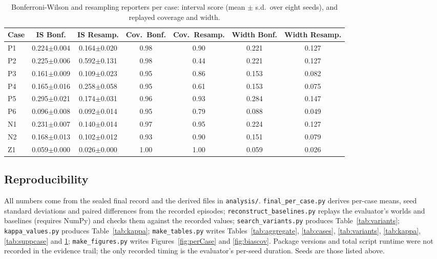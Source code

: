 \documentclass{article}
\begin{document}
\begin{table}[h]
\centering
\caption{Bonferroni-Wilson and resampling reporters per case: interval score (mean $\pm$ s.d.\ over eight seeds), and replayed coverage and width.}
\label{tab:suppbase}
\footnotesize
\setlength{\tabcolsep}{4pt}
\begin{tabular}{lcccccc}
\toprule
Case & IS Bonf. & IS Resamp. & Cov.\ Bonf. & Cov.\ Resamp. & Width Bonf. & Width Resamp. \\
\midrule
P1 & 0.224$\pm$0.004 & 0.164$\pm$0.020 & 0.98 & 0.90 & 0.221 & 0.127 \\
P2 & 0.225$\pm$0.006 & 0.592$\pm$0.131 & 0.98 & 0.44 & 0.221 & 0.127 \\
P3 & 0.161$\pm$0.009 & 0.109$\pm$0.023 & 0.95 & 0.86 & 0.153 & 0.082 \\
P4 & 0.165$\pm$0.016 & 0.258$\pm$0.058 & 0.95 & 0.61 & 0.153 & 0.075 \\
P5 & 0.295$\pm$0.021 & 0.174$\pm$0.031 & 0.96 & 0.93 & 0.284 & 0.147 \\
P6 & 0.096$\pm$0.008 & 0.092$\pm$0.014 & 0.95 & 0.79 & 0.088 & 0.049 \\
N1 & 0.231$\pm$0.007 & 0.140$\pm$0.014 & 0.97 & 0.95 & 0.224 & 0.127 \\
N2 & 0.168$\pm$0.013 & 0.102$\pm$0.012 & 0.93 & 0.90 & 0.151 & 0.079 \\
Z1 & 0.059$\pm$0.000 & 0.026$\pm$0.000 & 1.00 & 1.00 & 0.059 & 0.026 \\
\bottomrule
\end{tabular}
\end{table}

\subsection{Reproducibility}
All numbers come from the sealed final record and the derived files in \texttt{analysis/}. \texttt{final\_per\_case.py} derives per-case means, seed standard deviations and paired differences from the recorded episodes; \texttt{reconstruct\_baselines.py} replays the evaluator's worlds and baselines (requires NumPy) and checks them against the recorded values; \texttt{search\_variants.py} produces Table~\ref{tab:variants}; \texttt{kappa\_values.py} produces Table~\ref{tab:kappa}; \texttt{make\_tables.py} writes Tables~\ref{tab:aggregate}, \ref{tab:cases}, \ref{tab:variants}, \ref{tab:kappa}, \ref{tab:suppcase} and \ref{tab:suppbase}; \texttt{make\_figures.py} writes Figures~\ref{fig:perCase} and \ref{fig:biascov}. Package versions and total script runtime were not recorded in the evidence trail; the only recorded timing is the evaluator's per-seed duration. Seeds are those listed above.
\end{document}
